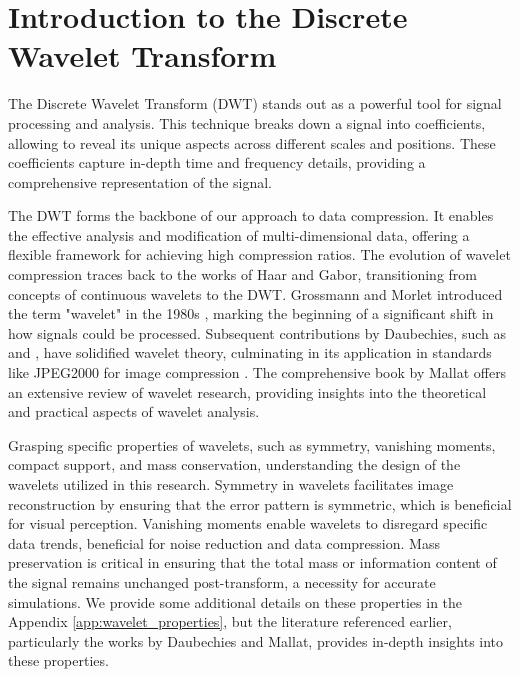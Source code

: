 
\section{Introduction to the Discrete Wavelet Transform} \label{sec:dwt_intro}



The Discrete Wavelet Transform (DWT) stands out as a powerful tool for signal processing and analysis.
This technique breaks down a signal into coefficients, allowing to reveal its unique aspects across different scales and positions.
These coefficients capture in-depth time and frequency details, providing a comprehensive representation of the signal.

The DWT forms the backbone of our approach to data compression.
It enables the effective analysis and modification of multi-dimensional data, offering a flexible framework for achieving high compression ratios.
The evolution of wavelet compression traces back to the works of Haar and Gabor, transitioning from concepts of continuous wavelets to the DWT.
Grossmann and Morlet introduced the term "wavelet" in the 1980s \cite{grossmann1984decomposition}, marking the beginning of a significant shift in how signals could be processed.
Subsequent contributions by Daubechies, such as \cite{daubechies1988orthonormal} and \cite{daubechies1992ten}, have solidified wavelet theory, culminating in its application in standards like JPEG2000 for image compression \cite{skodras2001jpeg}.
The comprehensive book by Mallat \cite{STEPHANE2009263} offers an extensive review of wavelet research, providing insights into the theoretical and practical aspects of wavelet analysis.

Grasping specific properties of wavelets, such as symmetry, vanishing moments, compact support, and mass conservation,  understanding the design of the wavelets utilized in this research.
Symmetry in wavelets facilitates image reconstruction by ensuring that the error pattern is symmetric, which is beneficial for visual perception.
Vanishing moments enable wavelets to disregard specific data trends, beneficial for noise reduction and data compression.
Mass preservation is critical in ensuring that the total mass or information content of the signal remains unchanged post-transform, a necessity for accurate simulations.
We provide some additional details on these properties in the Appendix \ref{app:wavelet_properties}, but the literature referenced earlier, particularly the works by Daubechies and Mallat, provides in-depth insights into these properties.

